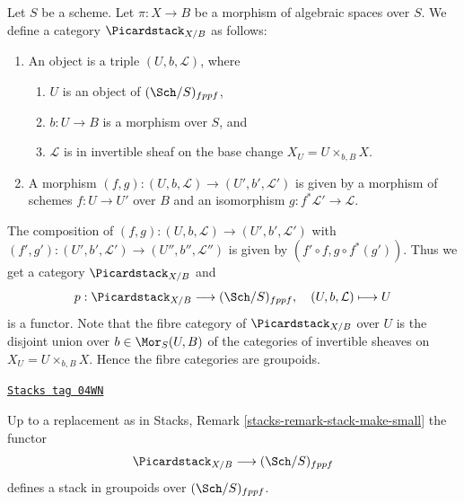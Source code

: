\medskip\noindent
Let $S$ be a scheme.
Let $\pi : X \to B$ be a morphism of algebraic spaces over $S$.
We define a category $\Picardstack_{X/B}$ as follows:
\begin{enumerate}
\item An object is a triple $(U, b, \mathcal{L})$, where
\begin{enumerate}
\item $U$ is an object of $(\Sch/S)_{fppf}$,
\item $b : U \to B$ is a morphism over $S$, and
\item $\mathcal{L}$ is in invertible sheaf on the base change
$X_U = U \times_{b, B} X$.
\end{enumerate}
\item A morphism $(f, g) : (U, b, \mathcal{L}) \to (U', b', \mathcal{L}')$
is given by a morphism of schemes $f : U \to U'$ over $B$ and an
isomorphism $g : f^*\mathcal{L}' \to \mathcal{L}$.
\end{enumerate}
The composition of
$(f, g) : (U, b, \mathcal{L}) \to (U', b', \mathcal{L}')$
with
$(f', g') : (U', b', \mathcal{L}') \to (U'', b'', \mathcal{L}'')$
is given by $(f' \circ f, g \circ f^*(g'))$.
Thus we get a category $\Picardstack_{X/B}$ and
$$
p : \Picardstack_{X/B} \longrightarrow (\Sch/S)_{fppf},
\quad
(U, b, \mathcal{L}) \longmapsto U
$$
is a functor. Note that the fibre category of $\Picardstack_{X/B}$ over $U$
is the disjoint union over $b \in \Mor_S(U, B)$ of the categories
of invertible sheaves on $X_U = U \times_{b, B} X$. Hence the fibre
categories are groupoids.

\begin{lemma}
\label{examples-stacks-lemma-picard-stack}
\href{https://stacks.math.columbia.edu/tag/04WN}{\texttt{Stacks tag 04WN}}

Up to a replacement as in
Stacks, Remark \ref{stacks-remark-stack-make-small}
the functor
$$
\Picardstack_{X/B} \longrightarrow (\Sch/S)_{fppf}
$$
defines a stack in groupoids over $(\Sch/S)_{fppf}$.
\end{lemma}

